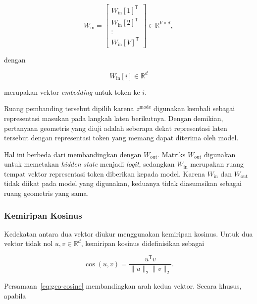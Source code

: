 \begin{equation}
    W_{\mathrm{in}}
    =
    \begin{bmatrix}
        W_{\mathrm{in}}[1]^{\mathsf T}\\
        W_{\mathrm{in}}[2]^{\mathsf T}\\
        \vdots\\
        W_{\mathrm{in}}[V]^{\mathsf T}
    \end{bmatrix}
    \in
    \mathbb{R}^{V\times d},
    \label{eq:geo-win}
\end{equation}

dengan

\begin{equation}
    W_{\mathrm{in}}[i]\in\mathbb{R}^{d}
\end{equation}

merupakan vektor \textit{embedding} untuk token ke-$i$.

Ruang pembanding tersebut dipilih karena $z^{\mathrm{mode}}$ digunakan kembali
sebagai representasi masukan pada langkah laten berikutnya. Dengan demikian,
pertanyaan geometris yang diuji adalah seberapa dekat representasi laten
tersebut dengan representasi token yang memang dapat diterima oleh model.

Hal ini berbeda dari membandingkan dengan $W_{\mathrm{out}}$. Matriks
$W_{\mathrm{out}}$ digunakan untuk memetakan \textit{hidden state} menjadi
\textit{logit}, sedangkan $W_{\mathrm{in}}$ merupakan ruang tempat vektor
representasi token diberikan kepada model. Karena $W_{\mathrm{in}}$ dan
$W_{\mathrm{out}}$ tidak diikat pada model yang digunakan, keduanya tidak
diasumsikan sebagai ruang geometris yang sama.

\subsubsection{Kemiripan Kosinus}

Kedekatan antara dua vektor diukur menggunakan kemiripan kosinus. Untuk dua
vektor tidak nol $u,v\in\mathbb{R}^{d}$, kemiripan kosinus didefinisikan sebagai

\begin{equation}
    \cos(u,v)
    =
    \frac{
        u^{\mathsf T}v
    }{
        \lVert u\rVert_2
        \lVert v\rVert_2
    }.
    \label{eq:geo-cosine}
\end{equation}

Persamaan~\eqref{eq:geo-cosine} membandingkan arah kedua vektor. Secara khusus, apabila

